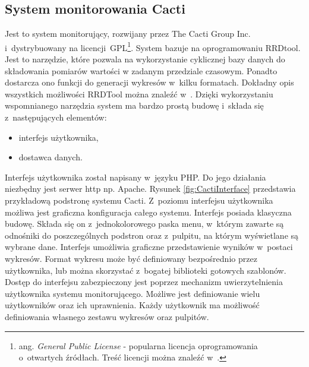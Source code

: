 \subsection[Cacti][System monitorowania Cacti]{System monitorowania Cacti}

Jest to system monitorujący, rozwijany przez The Cacti Group
Inc. i~dystrybuowany na licencji~GPL\footnote{ ang. {\em General
    Public License} - popularna licencja oprogramowania o~otwartych
  źródłach. Treść licencji można znaleźć w~\cite{www:GPLv2}.}. System
bazuje na oprogramowaniu RRDtool. Jest to narzędzie, które pozwala na
wykorzystanie cyklicznej bazy danych do składowania pomiarów wartości
w zadanym przedziale czasowym. Ponadto dostarcza ono funkcji do
generacji wykresów w~kilku formatach. Dokładny opis wszystkich
możliwości RRDTool można znaleźć w~\cite{www:RRDtool}. Dzięki
wykorzystaniu wspomnianego narzędzia system ma bardzo prostą budowę
i~składa się z~następujących elementów:

\begin{itemize}
\item interfejs użytkownika,
\item dostawca danych.
\end{itemize}

Interfejs użytkownika został napisany w~języku PHP. Do jego działania
niezbędny jest serwer http np. Apache. Rysunek
\ref{fig:CactiInterface} przedstawia przykładową podstronę systemu
Cacti. Z~poziomu interfejsu użytkownika możliwa jest graficzna
konfiguracja całego systemu. Interfejs posiada klasyczna
budowę. Składa się on z~jednokolorowego paska menu, w~którym zawarte
są odnośniki do poszczególnych podstron oraz z~pulpitu, na którym
wyświetlane są wybrane dane. Interfejs umożliwia graficzne
przedstawienie wyników w~postaci wykresów. Format wykresu może być
definiowany bezpośrednio przez użytkownika, lub można skorzystać
z~bogatej biblioteki gotowych szablonów. Dostęp do interfejsu
zabezpieczony jest poprzez mechanizm uwierzytelnienia użytkownika
systemu monitorującego. Możliwe jest definiowanie wielu użytkowników
oraz ich uprawnienia. Każdy użytkownik ma możliwość definiowania
własnego zestawu wykresów oraz pulpitów.

